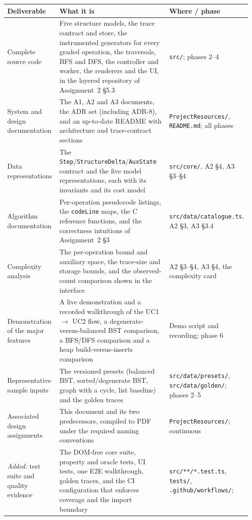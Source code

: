 \documentclass[11pt,a4paper]{article}
\newcommand{\ct}[1]{\texttt{#1}}
\begin{document}
\begin{table}[H]
\centering
\small
\setlength{\tabcolsep}{4pt}
\begin{tabular}{@{}L{3.6cm}L{6.6cm}L{4.2cm}@{}}
\toprule
\textbf{Deliverable} & \textbf{What it is} & \textbf{Where / phase} \\
\midrule
Complete source code & Five structure models, the trace contract and store, the instrumented
generators for every graded operation, the traversals, BFS and DFS, the controller and
worker, the renderers and the UI, in the layered repository of Assignment~2 \S5.3 &
\ct{src/}; phases 2--4 \\
System and design documentation & The A1, A2 and A3 documents, the ADR set (including
ADR-8), and an up-to-date README with architecture and trace-contract sections &
\ct{ProjectResources/}, \ct{README.md}; all phases \\
Data representations & The \ct{Step}/\ct{StructureDelta}/\ct{AuxState} contract and the five
model representations, each with its invariants and its cost model & \ct{src/core/},
A2 \S4, A3 \S3--\S4 \\
Algorithm documentation & Per-operation pseudocode listings, the \ct{codeLine} maps, the C
reference functions, and the correctness intuitions of Assignment~2 \S3 &
\ct{src/data/catalogue.ts}, A2 \S3, A3 \S3.4 \\
Complexity analysis & The per-operation bound and auxiliary space, the trace-size and storage
bounds, and the observed-count comparison shown in the interface & A2 \S3--\S4, A3 \S4,
the complexity card \\
Demonstration of the major features & A live demonstration and a recorded walkthrough of the
UC1 $\to$ UC2 flow, a degenerate-versus-balanced BST comparison, a BFS/DFS comparison and a
heap build-versus-inserts comparison & Demo script and recording; phase 6 \\
Representative sample inputs & The versioned presets (balanced BST, sorted/degenerate BST,
graph with a cycle, list baseline) and the golden traces & \ct{src/data/presets/},
\ct{src/data/golden/}; phases 2--5 \\
Associated design assignments & This document and its two predecessors, compiled to PDF under
the required naming conventions & \ct{ProjectResources/}; continuous \\
\emph{Added:} test suite and quality evidence & The DOM-free core suite, property and oracle
tests, UI tests, one E2E walkthrough, golden traces, and the CI configuration that enforces
coverage and the import boundary & \ct{src/**/*.test.ts}, \ct{tests/}, \ct{.github/workflows/};

\end{tabular}
\end{table}
\end{document}
